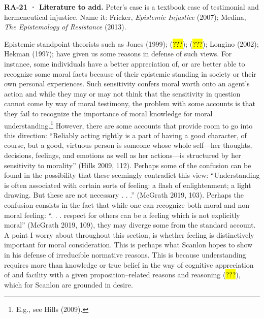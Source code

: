 \documentclass[
  letterpaper,
  DIV=11,
  numbers=noendperiod]{scrartcl}
\theoremstyle{remark}
\begin{document}
\begin{tcolorbox}[enhanced jigsaw, arc=.35mm, bottomrule=.15mm, bottomtitle=1mm, breakable, colback=white, colbacktitle=quarto-callout-tip-color!10!white, colframe=quarto-callout-tip-color-frame, coltitle=black, left=2mm, leftrule=.75mm, opacityback=0, opacitybacktitle=0.6, rightrule=.15mm, title=\textcolor{quarto-callout-tip-color}{\faLightbulb}\hspace{0.5em}{Tip}, titlerule=0mm, toprule=.15mm, toptitle=1mm]

\textbf{RA-21 · Literature to add.} Peter's case is a textbook case of
testimonial and hermeneutical injustice. Name it: Fricker,
\emph{Epistemic Injustice} (2007); Medina, \emph{The Epistemology of
Resistance} (2013).

\end{tcolorbox}

Epistemic standpoint theorists such as Jones (1999); (\hl{???});
(\hl{???}); Longino (2002); Hekman (1997); have given us some reasons in
defense of such views. For instance, some individuals have a better
appreciation of, or are better able to recognize some moral facts
because of their epistemic standing in society or their own personal
experiences. Such sensitivity confers moral worth onto an agent's action
and while they may or may not think that the sensitivity in question
cannot come by way of moral testimony, the problem with some accounts is
that they fail to recognize the importance of moral knowledge for moral
understanding.\footnote{E.g., see Hills (2009).} However, there are some
accounts that provide room to go into this direction: ``Reliably acting
rightly is a part of having a good character, of course, but a good,
virtuous person is someone whose whole self---her thoughts, decisions,
feelings, and emotions as well as her actions---is structured by her
sensitivity to morality'' (Hills 2009, 112). Perhaps some of the
confusion can be found in the possibility that these seemingly
contradict this view: ``Understanding is often associated with certain
sorts of feeling: a flash of enlightenment; a light drawing. But these
are not necessary . . .'' (McGrath 2019, 103). Perhaps the confusion
consists in the fact that while one can recognize both moral and
non-moral feeling: ``. . . respect for others can be a feeling which is
not explicitly moral'' (McGrath 2019, 109), they may diverge some from
the standard account. A point I worry about throughout this section, is
whether feeling is distinctively important for moral consideration. This
is perhaps what Scanlon hopes to show in his defense of irreducible
normative reasons. This is because understanding requires more than
knowledge or true belief in the way of cognitive appreciation of and
facility with a given proposition--related reasons and reasoning
(\hl{???}), which for Scanlon are grounded in desire.
\end{document}
